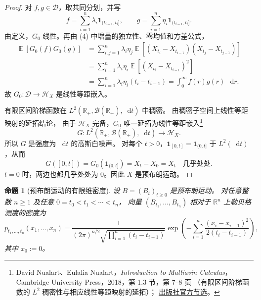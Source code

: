 \documentclass[UTF8,11pt,a4paper,oneside,fontset=fandol]{ctexrep}
\numberwithin{equation}{section}
\theoremstyle{plain}
\newtheorem{proposition}[theorem]{命题}
\theoremstyle{definition}
\theoremstyle{remark}
\newcommand{\R}{\mathbb{R}}
\newcommand{\B}{\mathcal{B}}
\newcommand{\Hcal}{\mathcal{H}}
\DeclareMathOperator{\E}{\mathbb{E}}
\newcommand{\ind}[1]{\mathbf{1}_{#1}}
\newcommand{\dd}{\mathop{}\!\mathrm{d}}
\begin{document}
\begin{proof}
对 $f,g\in\mathcal{D}$，取共同分划，并写
\[
  f=\sum_{i=1}^{n}\lambda_i\ind{(t_{i-1},t_i]},
  \qquad
  g=\sum_{i=1}^{n}\eta_i\ind{(t_{i-1},t_i]}.
\]
由定义，$G_0$ 线性。再由 (4) 中增量的独立性、零均值和方差公式，
\begin{align*}
  \E[G_0(f)G_0(g)]
  &=\sum_{i,j=1}^{n}\lambda_i\eta_j
       \E[(X_{t_i}-X_{t_{i-1}})(X_{t_j}-X_{t_{j-1}})]\\
  &=\sum_{i=1}^{n}\lambda_i\eta_i
       \E[(X_{t_i}-X_{t_{i-1}})^2]\\
  &=\sum_{i=1}^{n}\lambda_i\eta_i(t_i-t_{i-1})
   =\int_0^\infty f(r)g(r)\,\dd r.
\end{align*}
故 $G_0:\mathcal{D}\to\Hcal_X$ 是线性等距嵌入。

有限区间阶梯函数在 $L^2(\R_+,\B(\R_+),\dd t)$ 中稠密。
由稠密子空间上线性等距映射的延拓结论，
由于 $\Hcal_X$ 完备，$G_0$ 唯一延拓为线性等距嵌入\footnote{%
David Nualart、Eulalia Nualart，\emph{Introduction to Malliavin Calculus}，
Cambridge University Press，2018，第 1.3 节，第 7--8 页
（有限区间阶梯函数的 $L^2$ 稠密性与相应线性等距映射的延拓）；
\href{https://assets.cambridge.org/97811076/11986/excerpt/9781107611986_excerpt.pdf}{出版社官方节选}。}
\[
  G:L^2(\R_+,\B(\R_+),\dd t)\longrightarrow\Hcal_X.
\]
所以 $G$ 是强度为 $\dd t$ 的高斯白噪声。
对每个 $t>0$，$\ind{[0,t]}=\ind{(0,t]}$ 于 $L^2(\dd t)$，从而
\[
  G([0,t])=G_0(\ind{(0,t]})=X_t-X_0=X_t
  \quad\text{几乎处处}.
\]
$t=0$ 时，两边也都几乎处处为 $0$。因此 $X$ 是预布朗运动。
\end{proof}

\begin{proposition}[预布朗运动的有限维密度]
\label{prop:pre-brownian-finite-dimensional-density}
设 $B=(B_t)_{t\ge0}$ 是预布朗运动。
对任意整数 $n\ge1$ 及任意 $0=t_0<t_1<\cdots<t_n$，
向量 $(B_{t_1},\ldots,B_{t_n})$ 相对于 $\R^n$ 上勒贝格测度的密度为
\begin{equation}
  \label{eq:pre-brownian-finite-dimensional-density}
  p_{t_1,\ldots,t_n}(x_1,\ldots,x_n)
  =\frac{1}{(2\pi)^{n/2}\sqrt{\prod_{i=1}^{n}(t_i-t_{i-1})}}
    \exp\!\left(-\sum_{i=1}^{n}
      \frac{(x_i-x_{i-1})^2}{2(t_i-t_{i-1})}\right),
\end{equation}
其中 $x_0:=0$。
\end{proposition}
\end{document}
